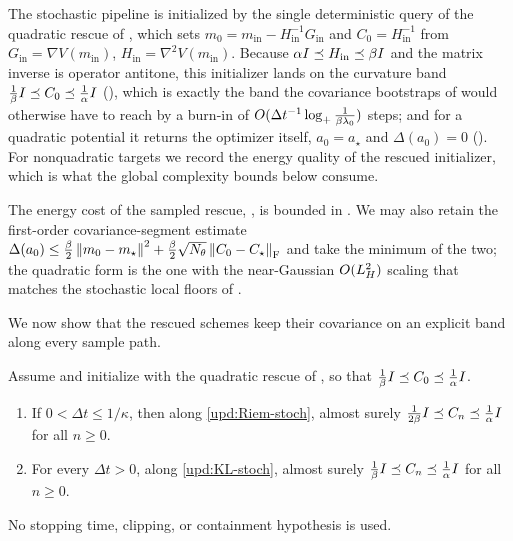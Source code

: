 The stochastic pipeline is initialized by the single deterministic query of the quadratic rescue of
, which sets
$m_0=m_{\mathrm{in}}-H_{\mathrm{in}}^{-1}G_{\mathrm{in}}$ and $C_0=H_{\mathrm{in}}^{-1}$ from
$G_{\mathrm{in}}=\nabla V(m_{\mathrm{in}})$, $H_{\mathrm{in}}=\nabla^2V(m_{\mathrm{in}})$. Because
$\alpha I\preceq H_{\mathrm{in}}\preceq\beta I$ and the matrix inverse is operator antitone, this
initializer lands on the curvature band $\tfrac1\beta I\preceq C_0\preceq\tfrac1\alpha I$
(), which is exactly the band the covariance bootstraps of 
would otherwise have to reach by a burn-in of $O(\Delta t^{-1}\log_+\tfrac1{\beta\lambda_0})$ steps; and
for a quadratic potential it returns the optimizer itself, $a_0=a_\star$ and $\Delta(a_0)=0$
(). For nonquadratic targets we record the energy quality of the rescued
initializer, which is what the global complexity bounds below consume.

The energy cost of the sampled rescue, , is bounded in .
We may also retain the first-order covariance-segment
estimate $\Delta(a_0)\leq\tfrac\beta2\left\lVert m_0-m_\star\right\rVert^2+\tfrac\beta2\sqrt{N_\theta}\left\lVert C_0-C_\star\right\rVert_{\mathrm{F}}$
and take the minimum of the two; the quadratic form is the one with the near-Gaussian $O(L_H^2)$
scaling that matches the stochastic local floors of .

We now show that the rescued schemes keep their covariance on an explicit band along every sample
path.

\begin{lemma}
\label{lem:stoch-band}
Assume  and initialize with the quadratic rescue of , so that
$\tfrac1\beta I\preceq C_0\preceq\tfrac1\alpha I$.
\begin{enumerate}
\item If $0<\Delta t\leq1/\kappa$, then along \eqref{upd:Riem-stoch}, almost surely
$\tfrac1{2\beta}I\preceq C_n\preceq\tfrac1\alpha I$ for all $n\geq0$.
\item For every $\Delta t>0$, along \eqref{upd:KL-stoch}, almost surely
$\tfrac1\beta I\preceq C_n\preceq\tfrac1\alpha I$ for all $n\geq0$.
\end{enumerate}
No stopping time, clipping, or containment hypothesis is used.
\end{lemma}

